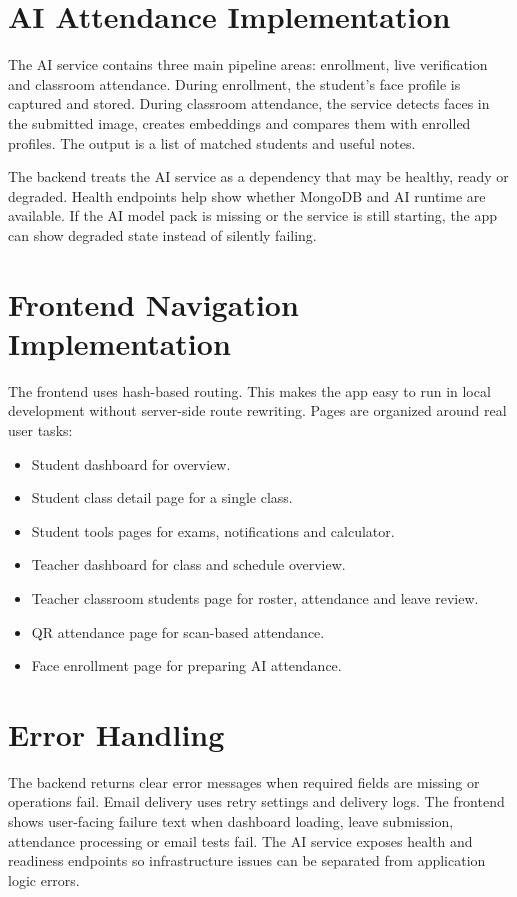\section{AI Attendance Implementation}

The AI service contains three main pipeline areas: enrollment, live verification and classroom attendance. During enrollment, the student's face profile is captured and stored. During classroom attendance, the service detects faces in the submitted image, creates embeddings and compares them with enrolled profiles. The output is a list of matched students and useful notes.

The backend treats the AI service as a dependency that may be healthy, ready or degraded. Health endpoints help show whether MongoDB and AI runtime are available. If the AI model pack is missing or the service is still starting, the app can show degraded state instead of silently failing.

\section{Frontend Navigation Implementation}

The frontend uses hash-based routing. This makes the app easy to run in local development without server-side route rewriting. Pages are organized around real user tasks:

\begin{itemize}
\item Student dashboard for overview.
\item Student class detail page for a single class.
\item Student tools pages for exams, notifications and calculator.
\item Teacher dashboard for class and schedule overview.
\item Teacher classroom students page for roster, attendance and leave review.
\item QR attendance page for scan-based attendance.
\item Face enrollment page for preparing AI attendance.
\end{itemize}

\section{Error Handling}

The backend returns clear error messages when required fields are missing or operations fail. Email delivery uses retry settings and delivery logs. The frontend shows user-facing failure text when dashboard loading, leave submission, attendance processing or email tests fail. The AI service exposes health and readiness endpoints so infrastructure issues can be separated from application logic errors.

